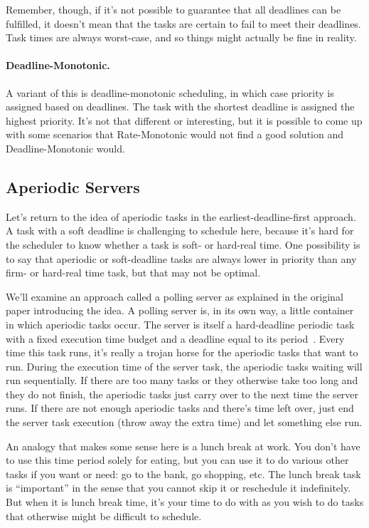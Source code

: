 Remember, though, if it's not possible to guarantee that all deadlines can be fulfilled, it doesn't mean that the tasks are certain to fail to meet their deadlines. Task times are always worst-case, and so things might actually be fine in reality.

\paragraph{Deadline-Monotonic.} A variant of this is deadline-monotonic scheduling, in which case priority is assigned based on deadlines. The task with the shortest deadline is assigned the highest priority. It's not that different or interesting, but it is possible to come up with some scenarios that Rate-Monotonic would not find a good solution and Deadline-Monotonic would.

\subsection*{Aperiodic Servers}
Let's return to the idea of aperiodic tasks in the earliest-deadline-first approach. A task with a soft deadline is challenging to schedule here, because it's hard for the scheduler to know whether a task is soft- or hard-real time. One possibility is to say that aperiodic or soft-deadline tasks are always lower in priority than any firm- or hard-real time task, but that may not be optimal. 

We'll examine an approach called a polling server as explained in the original paper introducing the idea. A polling server is, in its own way, a little container in which aperiodic tasks occur. The server is itself a hard-deadline periodic task with a fixed execution time budget and a deadline equal to its period~\cite{aperiodic-server}. Every time this task runs, it's really a trojan horse for the aperiodic tasks that want to run. During the execution time of the server task, the aperiodic tasks waiting will run sequentially. If there are too many tasks or they otherwise take too long and they do not finish, the aperiodic tasks just carry over to the next time the server runs. If there are not enough aperiodic tasks and there's time left over, just end the server task execution (throw away the extra time) and let something else run.

An analogy that makes some sense here is a lunch break at work. You don't have to use this time period solely for eating, but you can use it to do various other tasks if you want or need: go to the bank, go shopping, etc. The lunch break task is ``important'' in the sense that you cannot skip it or reschedule it indefinitely. But when it is lunch break time, it's your time to do with as you wish to do tasks that otherwise might be difficult to schedule.


